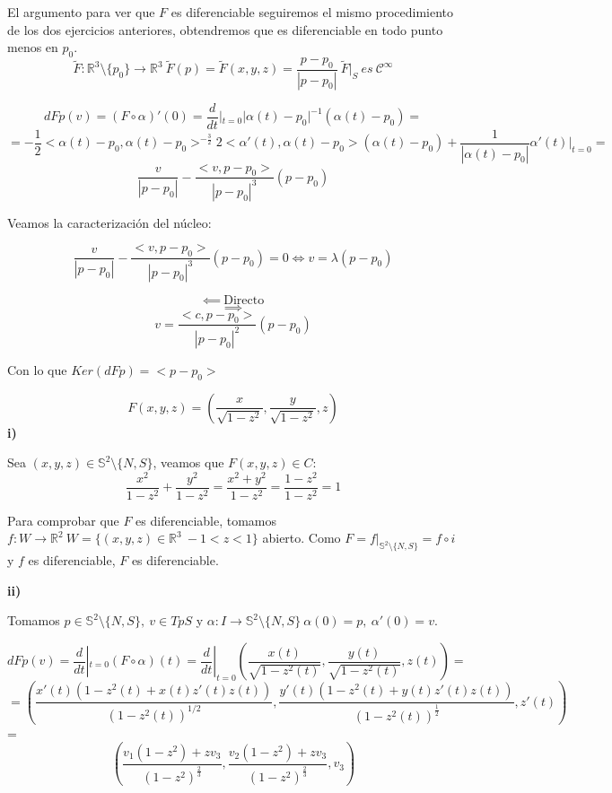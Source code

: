 \documentclass[openany]{book}
\begin{document}
\begin{exercise}
    El argumento para ver que $ F $ es diferenciable seguiremos el mismo procedimiento de los dos ejercicios anteriores, obtendremos que es diferenciable en todo punto menos en $ p_0 $.
    $$ \widetilde{F}: \mathbb{R}^3 \setminus \{p_0\} \to \mathbb{R}^3 \ \widetilde{F}(p) = \widetilde{F}(x,y,z) = \dfrac{p-p_0}{|p-p_0|}\ \widetilde{F}|_{S}\ es\ \mathcal{C}^{\infty}$$

    $$ dFp(v) = (F \circ \alpha)' (0) = \dfrac{d}{dt}|_{t=0} |\alpha(t) - p_0 | ^{-1} (\alpha (t)-p_0) =$$$$= -\dfrac{1}{2}<\alpha(t)-p_0,\alpha(t)-p_0> ^{-\frac{3}{2}} 2<\alpha'(t),\alpha(t)-p_0>(\alpha(t)-p_0) + \dfrac{1}{|\alpha(t)-p_0|}\alpha'(t)|_{t=0} = $$
    $$ \dfrac{v}{|p-p_0|}- \dfrac{<v,p-p_0>}{|p-p_0|^3}(p-p_0)  $$

    Veamos la caracterización del núcleo:

    $$ \dfrac{v}{|p-p_0|}- \dfrac{<v,p-p_0>}{|p-p_0|^3}(p-p_0) = 0 \iff v = \lambda(p-p_0)  $$

    $$ \impliedby\ \text{Directo} $$
    $$ \implies  $$
    $$ v = \dfrac{<c,p-p_0>}{|p-p_0|^2}(p-p_0) $$

    Con lo que $ Ker(dFp) = <p-p_0> $
    


\end{exercise}

\begin{exercise}
    $$ F(x,y,z) = \left( \dfrac{x}{\sqrt{1-z^2}},\dfrac{y}{\sqrt{1-z^2}},z \right) $$
    \textbf{i)}

    Sea $  (x,y,z) \in \mathbb{S}^2 \setminus \{N,S\} $, veamos que $ F(x,y,z) \in C $:
    $$ \dfrac{x^2}{1-z^2}+\dfrac{y^2}{1-z^2} = \dfrac{x^2+y^2}{1-z^2} = \dfrac{1-z^2}{1-z^2} = 1 $$    

    Para comprobar que $ F $ es diferenciable, tomamos $ f: W \to \mathbb{R}^2\ W = \{(x,y,z) \in \mathbb{R}^3\ -1<z<1\}$ abierto. Como $F =  f|_{\mathbb{S}^2 \setminus \{N,S\}} = f \circ i $ y $ f $ es diferenciable, $ F $ es diferenciable.

    \textbf{ii)}

    Tomamos $ p \in \mathbb{S}^2 \setminus \{N,S\},\ v \in TpS  $ y $ \alpha: I \to \mathbb{S}^2 \setminus \{N,S\}\ \alpha(0) = p,\ \alpha'(0) = v $.

    $$ dFp(v) = \dfrac{d}{dt}|_{t=0}(F\circ \alpha)(t) = \dfrac{d}{dt}|_{t=0} \left( \dfrac{x(t)}{\sqrt{1-z^2(t)}},\dfrac{y(t)}{\sqrt{1-z^2(t)}},z(t) \right)=$$
     $$= \left( \dfrac{x'(t)(1-z^2(t)+x(t)z'(t)z(t))}{(1-z^2(t))^{1/2}}, \dfrac{y'(t)(1-z^2(t)+y(t)z'(t)z(t))}{(1-z^2(t))^{\frac{1}{2}}}, z'(t)\right) $$=$$ \left( \dfrac{v_1(1-z^2)+zv_3}{(1-z^2)^{\frac{2}{3}}},\dfrac{v_2(1-z^2)+zv_3}{(1-z^2)^{\frac{2}{3}}},v_3 \right)$$



\end{exercise}
\end{document}
